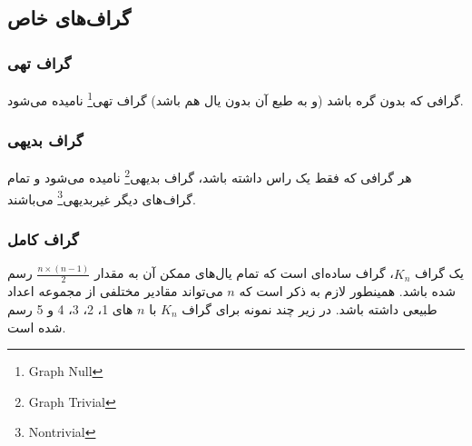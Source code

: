 \documentclass[a4paper,10pt]{book}
\begin{document}
\begin{itemize}
\begin{center}

                \end{center}

            \end{itemize}

            \subsection{گراف‌های خاص}

                \subsubsection{گراف تهی}

                    گرافی که بدون گره باشد (و به طبع آن بدون یال‌ هم باشد) گراف تهی\footnote{\hspace{2pt}Graph Null} نامیده می‌شود.
                
                \subsubsection{گراف بدیهی}

                    هر گرافی که فقط یک راس داشته باشد، گراف بدیهی\footnote{\hspace{2pt}Graph Trivial} نامیده می‌شود و تمام گراف‌های دیگر غیربدیهی\footnote{\hspace{2pt}Nontrivial} می‌باشند.

                \subsubsection{گراف کامل}

                    یک گراف $K_n$، گراف ساده‌ای است که تمام یال‌های ممکن آن به مقدار $\frac{n \times (n-1)}{2}$ رسم شده باشد. همینطور لازم به ذکر است که $n$ می‌تواند مقادیر مختلفی از مجموعه اعداد طبیعی داشته باشد. در زیر چند نمونه برای گراف $K_n$ با $n$ های 1، 2، 3، 4 و 5 رسم شده است.
\end{document}
